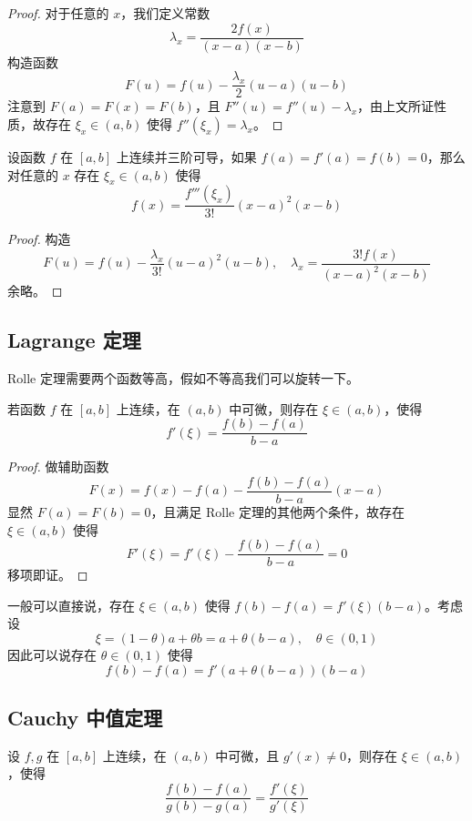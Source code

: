 \begin{proof}
	对于任意的 $x$，我们定义常数
	\[ \lambda_x = \frac{2 f(x)}{(x - a)(x - b)} \]
	构造函数
	\[ F(u) = f(u) - \frac{\lambda_x}{2} (u-a)(u-b) \]
	注意到 $F(a) = F(x) = F(b)$，且 $F''(u) = f''(u) - \lambda_x$，由上文所证性质，故存在 $\xi_x \in (a, b)$ 使得 $f''(\xi_x) = \lambda_x$。
\end{proof}

\begin{example}
	设函数 $f$ 在 $[a,b]$ 上连续并三阶可导，如果 $f(a) = f'(a) = f(b) = 0$，那么对任意的 $x$ 存在 $\xi_x \in (a, b)$ 使得
	\[ f(x) = \frac{f'''(\xi_x)}{3!} (x-a)^2(x-b) \]
\end{example}

\begin{proof}
	构造
	\[ F(u) = f(u) - \frac{\lambda_x}{3!}(u-a)^2(u-b), \quad \lambda_x = \frac{3! f(x)}{(x-a)^2(x-b)} \]
	余略。
\end{proof}


\subsection{Lagrange 定理}

Rolle 定理需要两个函数等高，假如不等高我们可以旋转一下。

\begin{theorem}[Lagrange 定理]
	若函数 $f$ 在 $[a,b]$ 上连续，在 $(a,b)$ 中可微，则存在 $\xi\in(a,b)$，使得
	\[ f'(\xi)=\frac{f(b)-f(a)}{b-a} \]
\end{theorem}

\begin{proof}
	做辅助函数
	\[ F(x) = f(x) - f(a) - \frac{f(b) - f(a)}{b - a}(x - a) \]
	显然 $F(a) = F(b) = 0$，且满足 Rolle 定理的其他两个条件，故存在 $\xi \in (a, b)$ 使得
	\[ F'(\xi) = f'(\xi) - \frac{f(b) - f(a)}{b - a} = 0 \]
	移项即证。
\end{proof}

一般可以直接说，存在 $\xi \in (a, b)$ 使得 $f(b) - f(a) = f'(\xi)(b-a)$。考虑设
\[ \xi = (1-\theta)a + \theta b = a + \theta(b-a), \quad \theta \in (0, 1) \]
因此可以说存在 $\theta \in (0, 1)$ 使得
\[ f(b) - f(a) = f'(a + \theta(b-a)) (b-a) \]

\subsection{Cauchy 中值定理}

\begin{theorem}
	设 $f,g$ 在 $[a,b]$ 上连续，在 $(a,b)$ 中可微，且 $g'(x)\ne 0$，则存在 $\xi\in (a,b)$，使得
	\[ \frac{f(b)-f(a)}{g(b)-g(a)} = \frac{f'(\xi)}{g'(\xi)} \]
\end{theorem}

